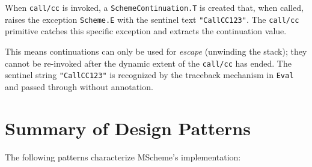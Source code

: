 \documentclass[12pt]{report}
\begin{document}
When \texttt{call/cc} is invoked, a \texttt{SchemeContinuation.T} is
created that, when called, raises the exception \texttt{Scheme.E} with
the sentinel text \texttt{"CallCC123"}.  The \texttt{call/cc} primitive
catches this specific exception and extracts the continuation value.

This means continuations can only be used for \emph{escape}
(unwinding the stack); they cannot be re-invoked after the dynamic
extent of the \texttt{call/cc} has ended.  The sentinel string
\texttt{"CallCC123"} is recognized by the traceback mechanism in
\texttt{Eval} and passed through without annotation.

\chapter{Summary of Design Patterns}
\label{ch:summary}

The following patterns characterize MScheme's implementation:
\end{document}
